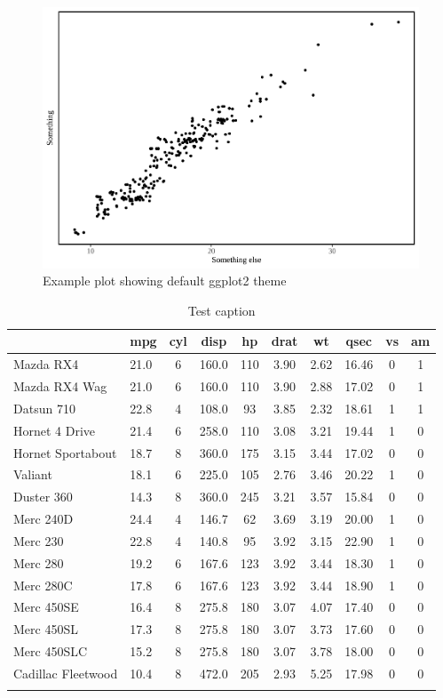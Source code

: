 \documentclass[a4paper, notitlepage]{extreport}
\begin{document}
\begin{figure}[tb]

{\centering \includegraphics[width=.75\linewidth]{skeleton_files/figure-latex/plot-1} 

}

\caption{Example plot showing default ggplot2 theme}\label{fig:plot}
\end{figure}

\lipsum

\begin{table}

\caption{\label{tab:table_1}Test caption}
\centering
\fontsize{9}{11}\selectfont
\begin{tabular}[t]{llcccccccc}
\toprule{}
\textbf{ } & \textbf{mpg} & \textbf{cyl} & \textbf{disp} & \textbf{hp} & \textbf{drat} & \textbf{wt} & \textbf{qsec} & \textbf{vs} & \textbf{am}\\
\midrule{}
Mazda RX4 & 21.0 & 6 & 160.0 & 110 & 3.90 & 2.62 & 16.46 & 0 & 1\\
Mazda RX4 Wag & 21.0 & 6 & 160.0 & 110 & 3.90 & 2.88 & 17.02 & 0 & 1\\
Datsun 710 & 22.8 & 4 & 108.0 & 93 & 3.85 & 2.32 & 18.61 & 1 & 1\\
Hornet 4 Drive & 21.4 & 6 & 258.0 & 110 & 3.08 & 3.21 & 19.44 & 1 & 0\\
Hornet Sportabout & 18.7 & 8 & 360.0 & 175 & 3.15 & 3.44 & 17.02 & 0 & 0\\
Valiant & 18.1 & 6 & 225.0 & 105 & 2.76 & 3.46 & 20.22 & 1 & 0\\
Duster 360 & 14.3 & 8 & 360.0 & 245 & 3.21 & 3.57 & 15.84 & 0 & 0\\
Merc 240D & 24.4 & 4 & 146.7 & 62 & 3.69 & 3.19 & 20.00 & 1 & 0\\
Merc 230 & 22.8 & 4 & 140.8 & 95 & 3.92 & 3.15 & 22.90 & 1 & 0\\
Merc 280 & 19.2 & 6 & 167.6 & 123 & 3.92 & 3.44 & 18.30 & 1 & 0\\
Merc 280C & 17.8 & 6 & 167.6 & 123 & 3.92 & 3.44 & 18.90 & 1 & 0\\
Merc 450SE & 16.4 & 8 & 275.8 & 180 & 3.07 & 4.07 & 17.40 & 0 & 0\\
Merc 450SL & 17.3 & 8 & 275.8 & 180 & 3.07 & 3.73 & 17.60 & 0 & 0\\
Merc 450SLC & 15.2 & 8 & 275.8 & 180 & 3.07 & 3.78 & 18.00 & 0 & 0\\
Cadillac Fleetwood & 10.4 & 8 & 472.0 & 205 & 2.93 & 5.25 & 17.98 & 0 & 0\\
\bottomrule{}
\end{tabular}
\end{table}
\end{document}

